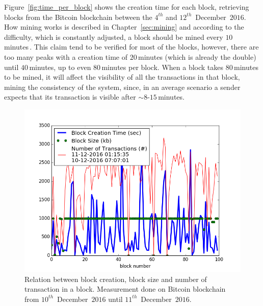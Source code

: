 \documentclass[USenglish]{uit-thesis}
\begin{document}
Figure~\ref{fig:time_per_block} shows the creation time for each block,
retrieving blocks from the Bitcoin blockchain between the $4^{th}$
and $12^{th}$~December~$2016$. How mining works is described in
Chapter~\ref{sec:mining} and according to the difficulty, which is constantly adjusted, a
block should be mined every $10$\,minutes\,\cite{bitcoinmining}. This claim
tend to be verified for most of the blocks, however, there are too many peaks with a
creation time of $20$\,minutes (which is already the double) until $40$\,minutes, up to even
$80$\,minutes per block. When a block takes $80$\,minutes to be mined, it will affect the
visibility of all the transactions in that block, mining the consistency of the system, since, in
an average scenario a sender expects that its transaction is visible after $\sim8$-$15$\,minutes.
\begin{figure}[h]
	\centering
	\includegraphics[width=1\textwidth]{img/efficiency(100)}
	\caption{Relation between block creation, block size and number
		of transaction in a block. Measurement done on
		Bitcoin blockchain from $10^{th}$~December~$2016$ until
		$11^{th}$~December~$2016$.}
	\label{fig:efficiency}
\end{figure}
\end{document}
